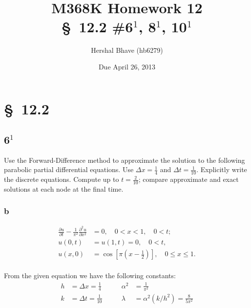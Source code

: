 \documentclass[12pt]{article}
\title{M368K Homework 12 \\
  \normalsize{\S~12.2 \#6$^1$, 8$^1$, 10$^1$ }}
\author{Hershal Bhave (hb6279)}
\date{Due April 26, 2013}
\begin{document}
\maketitle

\section{\S~12.2}
\subsection{6$^1$}
\label{sec:6}
Use the Forward-Difference method to approximate the solution to the
following parabolic partial differential equations. Use $\Delta x =
\frac{1}{4}$ and $\Delta t = \frac{1}{10}$. Explicitly write the
discrete equations. Compute up to $t=\frac{2}{10}$; compare
approximate and exact solutions at each node at the final time.

\subsubsection{b}
\begin{equation}
\label{eq:6b_q}
\begin{aligned}
  \frac{\partial u}{\partial t} - \frac{1}{\pi^2}
  \frac{\partial^2u}{\partial x^2} &= 0,\quad 0<x<1,\quad 0<t;\\
  u(0,t) &= u(1,t)=0, \quad 0<t,\\
  u(x,0) &= \cos\left[\pi \left(x-\frac{1}{2}\right)\right], \quad
  0\leq x \leq 1.\\ 
\end{aligned}
\end{equation}

From the given equation we have the following constants:
\begin{equation}
  \label{eq:6b_const}
  \begin{aligned}
    h &= \Delta x = \frac{1}{4} \qquad&  \alpha^2 &= \frac{1}{\pi^2} \\
    k &= \Delta t = \frac{1}{10} \qquad& \lambda &= \alpha^2(k/h^2) = \frac{8}{5\pi^2} \\
  \end{aligned}
\end{equation}
\end{document}
